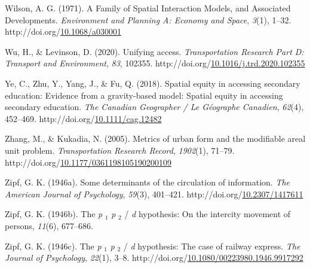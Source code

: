 \documentclass[
11pt, %
oneside, %
english, %
singlespacing, %
]{macthesis} %
\newlength{\cslhangindent}
\newenvironment{CSLReferences}[2] %
{\begin{list}{}{%
	\setlength{\itemindent}{0pt}
	\setlength{\leftmargin}{0pt}
	\setlength{\parsep}{0pt}
	\ifodd #1
	\setlength{\leftmargin}{\cslhangindent}
	\setlength{\itemindent}{-1\cslhangindent}
	\fi
	\setlength{\itemsep}{#2\baselineskip}}}
{\end{list}}
\begin{document}
\begin{CSLReferences}{1}{0}
Wilson, A. G. (1971). A Family of Spatial Interaction Models, and Associated Developments. \emph{Environment and Planning A: Economy and Space}, \emph{3}(1), 1--32. http://doi.org/\href{https://doi.org/10.1068/a030001}{10.1068/a030001}

Wu, H., \& Levinson, D. (2020). Unifying access. \emph{Transportation Research Part D: Transport and Environment}, \emph{83}, 102355. http://doi.org/\href{https://doi.org/10.1016/j.trd.2020.102355}{10.1016/j.trd.2020.102355}

Ye, C., Zhu, Y., Yang, J., \& Fu, Q. (2018). Spatial equity in accessing secondary education: {Evidence} from a gravity-based model: {Spatial} equity in accessing secondary education. \emph{The Canadian Geographer / Le Géographe Canadien}, \emph{62}(4), 452--469. http://doi.org/\href{https://doi.org/10.1111/cag.12482}{10.1111/cag.12482}

Zhang, M., \& Kukadia, N. (2005). Metrics of urban form and the modifiable areal unit problem. \emph{Transportation Research Record}, \emph{1902}(1), 71--79. http://doi.org/\href{https://doi.org/10.1177/0361198105190200109}{10.1177/0361198105190200109}

Zipf, G. K. (1946a). Some determinants of the circulation of information. \emph{The American Journal of Psychology}, \emph{59}(3), 401--421. http://doi.org/\href{https://doi.org/10.2307/1417611}{10.2307/1417611}

Zipf, G. K. (1946b). The \emph{p} \(_{\textrm{1}}\) \emph{p} \(_{\textrm{2}}\) / \emph{d} hypothesis: On the intercity movement of persons, \emph{11}(6), 677--686.

Zipf, G. K. (1946c). The \emph{p} \(_{\textrm{1}}\) \emph{p} \(_{\textrm{2}}\) / \emph{d} hypothesis: The case of railway express. \emph{The Journal of Psychology}, \emph{22}(1), 3--8. http://doi.org/\href{https://doi.org/10.1080/00223980.1946.9917292}{10.1080/00223980.1946.9917292}

\end{CSLReferences}
\end{document}
